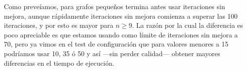 \begin{figure}[H]
    \begin{minipage}[t]{\linewidth}
		\centering
		\label{fig:ejercicio-5-tiempos-grasp-primeros-nodos-conjunto-1}
    \end{minipage}
\end{figure}

Como preveíamos, para grafos pequeños termina antes usar iteraciones sin mejora, aunque rápidamente iteraciones sin mejora comienza a superar las 100 iteraciones, y por esto es mayor para $n \geq 9$. La razón por la cual la diferencia es poco apreciable es que estamos usando como límite de iteraciones sin mejora a 70, pero ya vimos en el test de configuración que para valores menores a 15 podríamos usar 10, 35 ó 50 y así ---sin perder calidad--- obtener mayores diferencias en el tiempo de ejecución.
